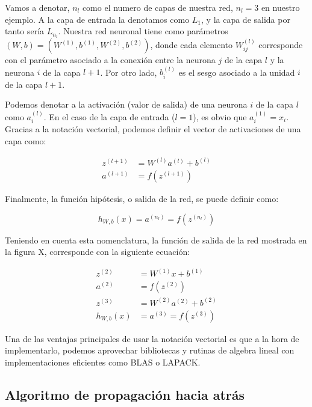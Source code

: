 \documentclass[
  12pt,
  a4paperpaper,
]{report}
\begin{document}
Vamos a denotar, \(n_l\) como el numero de capas de nuestra red,
\(n_l=3\) en nuestro ejemplo. A la capa de entrada la denotamos como
\(L_1\), y la capa de salida por tanto sería \(L_{n_l}\). Nuestra red
neuronal tiene como parámetros
\((W, b)= \left(W^{(1)}, b^{(1)}, W^{(2)}, b^{(2)}\right)\), donde cada
elemento \(W_{i j}^{(l)}\) corresponde con el parámetro asociado a la
conexión entre la neurona \(j\) de la capa \(l\) y la neurona \(i\) de
la capa \(l + 1\). Por otro lado, \(b_{i}^{(l)}\) es el sesgo asociado a
la unidad \(i\) de la capa \(l + 1\).

Podemos denotar a la activación (valor de salida) de una neurona \(i\)
de la capa \(l\) como \(a_{i}^{(l)}\). En el caso de la capa de entrada
(\(l = 1\)), es obvio que \(a_{i}^{(1)}=x_{i}\). Gracias a la notación
vectorial, podemos definir el vector de activaciones de una capa como:

\[
\begin{aligned}
z^{(l+1)} &=W^{(l)} a^{(l)}+b^{(l)} \\
a^{(l+1)} &=f\left(z^{(l+1)}\right)
\end{aligned}
\]

Finalmente, la función hipótesis, o salida de la red, se puede definir
como:

\[h_{W, b}(x)=a^{(n_l)}=f\left(z^{(n_l)}\right)\]

Teniendo en cuenta esta nomenclatura, la función de salida de la red
mostrada en la figura X, corresponde con la siguiente ecuación:

\[
\begin{aligned}
z^{(2)} &=W^{(1)} x+b^{(1)} \\
a^{(2)} &=f\left(z^{(2)}\right) \\
z^{(3)} &=W^{(2)} a^{(2)}+b^{(2)} \\
h_{W, b}(x) &=a^{(3)}=f\left(z^{(3)}\right)
\end{aligned}
\]

Una de las ventajas principales de usar la notación vectorial es que a
la hora de implementarlo, podemos aprovechar bibliotecas y rutinas de
algebra lineal con implementaciones eficientes como BLAS o LAPACK.

\hypertarget{algoritmo-de-propagaciuxf3n-hacia-atruxe1s}{%
\subsection{Algoritmo de propagación hacia
atrás}\label{algoritmo-de-propagaciuxf3n-hacia-atruxe1s}}
\end{document}
